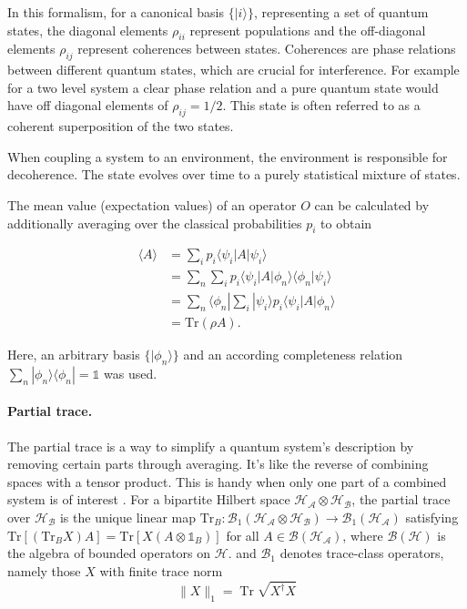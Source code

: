 \noindent
In this formalism, for a canonical basis $\{|i\rangle\}$, representing a set of quantum states, the diagonal elements $\rho_{ii} $ represent populations and the off-diagonal elements $\rho_{ij} $ represent coherences between states.
Coherences are phase relations between different quantum states, which are crucial for interference.
For example for a two level system a clear phase relation and a pure quantum state would have off diagonal elements of $ \rho_{ij} = 1/2$.
This state is often referred to as a coherent superposition of the two states.

When coupling a system to an environment, the environment is responsible for decoherence.
The state evolves over time to a purely statistical mixture of states.

The mean value (expectation values) of an operator $O$ can be calculated by additionally averaging over the classical probabilities $p_i$ to obtain

\begin{align}
\langle A \rangle &= \sum_i p_i \langle \psi_i | A | \psi_i \rangle \\
&= \sum_n \sum_i p_i \langle \psi_i | A | \phi_n \rangle \langle \phi_n | \psi_i \rangle \\
&= \sum_n \langle \phi_n | \sum_i |\psi_i\rangle p_i \langle \psi_i | A | \phi_n \rangle \\
&= \mathrm{Tr}(\rho A).
\end{align}

\noindent
Here, an arbitrary basis $\{|\phi_n\rangle\}$ and an according completeness relation $\sum_n |\phi_n\rangle \langle \phi_n| = \mathds{1}$ was used.


\paragraph{Partial trace.}

\noindent
The partial trace is a way to simplify a quantum system's description by removing certain parts through averaging. It's like the reverse of combining spaces with a tensor product. This is handy when only one part of a combined system is of interest \cite{lambertetal2024qutip5quantum}.
For a bipartite Hilbert space $\mathcal{H_A} \otimes \mathcal{H_B}$, the partial trace over $\mathcal{H_B}$ is the unique linear map $\mathrm{Tr}_B: \mathcal{B}_1(\mathcal{H_A} \otimes \mathcal{H_B}) \to \mathcal{B}_1(\mathcal{H_A})$ satisfying $\mathrm{Tr}[(\mathrm{Tr}_B X) A] = \mathrm{Tr}[X (A \otimes \mathds{1}_B)]$ for all $A \in \mathcal{B}(\mathcal{H_A})$, where  $\mathcal{B}(\mathcal{H})$ is the algebra of bounded operators on $\mathcal{H}$.
and $\mathcal{B}_1$ denotes trace-class operators, namely those $X$ with finite trace norm 
\[ 
  \| X \|_1 = \operatorname{Tr} \sqrt{X^\dagger X} 
\]

